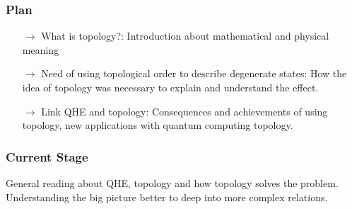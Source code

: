 \documentclass[12pt]{article}
\newcommand{\PRLsep}{\noindent\makebox[\linewidth]{\resizebox{0.3333\linewidth}{1pt}{$\bullet$}}\bigskip}
\begin{document}
\subsubsection*{Plan}
\begin{enumerate}
    \item[$\to$] What is topology?: Introduction about mathematical and physical meaning 
    \item[$\to$] Need of using topological order to describe degenerate states: How the idea of topology was necessary to explain and understand the effect. 
    \item[$\to$] Link QHE and topology: Consequences and achievements of using topology, new applications with quantum computing topology.  
\end{enumerate}
\subsubsection*{Current Stage}

General reading about QHE, topology and how topology solves the problem. Understanding the big picture better to deep into more complex relations.  

\vspace{0.5cm}
\PRLsep
\end{document}
